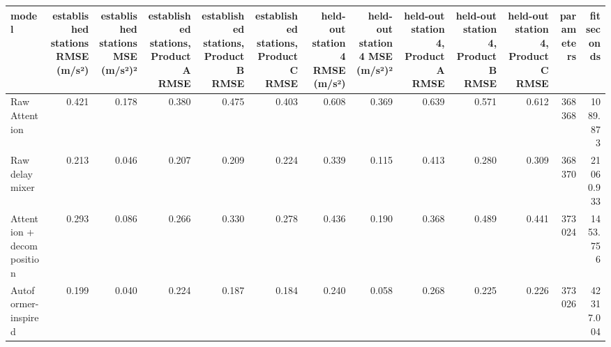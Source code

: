 \begin{tabular}{lrrrrrrrrrrrr}
\toprule
model & established stations RMSE (m/s²) & established stations MSE (m/s²)² & established stations, Product A RMSE & established stations, Product B RMSE & established stations, Product C RMSE & held-out station 4 RMSE (m/s²) & held-out station 4 MSE (m/s²)² & held-out station 4, Product A RMSE & held-out station 4, Product B RMSE & held-out station 4, Product C RMSE & parameters & fit seconds \\
\midrule
Raw Attention & 0.421 & 0.178 & 0.380 & 0.475 & 0.403 & 0.608 & 0.369 & 0.639 & 0.571 & 0.612 & 368368 & 1089.873 \\
Raw delay mixer & 0.213 & 0.046 & 0.207 & 0.209 & 0.224 & 0.339 & 0.115 & 0.413 & 0.280 & 0.309 & 368370 & 21060.933 \\
Attention + decomposition & 0.293 & 0.086 & 0.266 & 0.330 & 0.278 & 0.436 & 0.190 & 0.368 & 0.489 & 0.441 & 373024 & 1453.756 \\
Autoformer-inspired & 0.199 & 0.040 & 0.224 & 0.187 & 0.184 & 0.240 & 0.058 & 0.268 & 0.225 & 0.226 & 373026 & 42317.004 \\
\bottomrule
\end{tabular}
